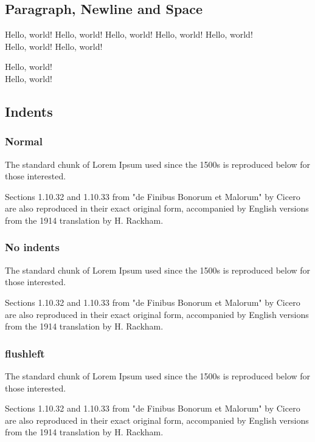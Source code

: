 \documentclass{article}
\begin{document}
\subsection{Paragraph, Newline and Space}

Hello, world! Hello, world! \newline
Hello, world!                Hello, world! \newline
Hello, world! \\
Hello, world!
Hello, world! \par
Hello, world! \\
Hello, world!

\subsection{Indents}

\subsubsection{Normal}

The standard chunk of Lorem Ipsum used since the 1500s is reproduced below for those interested. \par
Sections 1.10.32 and 1.10.33 from "de Finibus Bonorum et Malorum" by Cicero are also reproduced in their exact original form, accompanied by English versions from the 1914 translation by H. Rackham.


\subsubsection{No indents}

The standard chunk of Lorem Ipsum used since the 1500s is reproduced below for those interested. \par
Sections 1.10.32 and 1.10.33 from "de Finibus Bonorum et Malorum" by Cicero are also reproduced in their exact original form, accompanied by English versions from the 1914 translation by H. Rackham.

\subsubsection{flushleft}

\begin{flushleft}
The standard chunk of Lorem Ipsum used since the 1500s is reproduced below for those interested. \par
Sections 1.10.32 and 1.10.33 from "de Finibus Bonorum et Malorum" by Cicero are also reproduced in their exact original form, accompanied by English versions from the 1914 translation by H. Rackham.
\end{flushleft}
\end{document}
